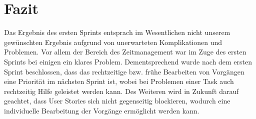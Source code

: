 \documentclass[12pt,a4paper, oneside]{article}
\begin{document}
    \section{Fazit}
    Das Ergebnis des ersten Sprints entsprach im Wesentlichen nicht unserem gewünschten Ergebnis aufgrund von unerwarteten Komplikationen und Problemen. Vor allem der Bereich des Zeitmanagement war im Zuge des ersten Sprints bei einigen ein klares Problem. Dementsprechend wurde nach dem ersten Sprint beschlossen, dass das rechtzeitige bzw. frühe Bearbeiten von Vorgängen eine Priorität im nächsten Sprint ist, wobei bei Problemen einer Task auch rechtzeitig Hilfe geleistet werden kann. Des Weiteren wird in Zukunft darauf geachtet, dass User Stories sich nicht gegenseitig blockieren, wodurch eine individuelle Bearbeitung der Vorgänge ermöglicht werden kann.
\end{document}
